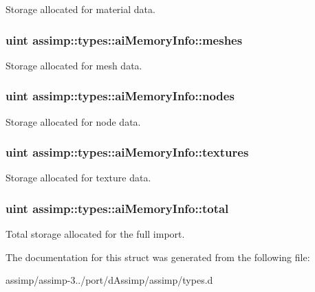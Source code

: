 Storage allocated for material data. \hypertarget{structassimp_1_1types_1_1ai_memory_info_a48f750621e7eba688fb3865838733fa6}{
\subsubsection[{meshes}]{\setlength{\rightskip}{0pt plus 5cm}uint assimp\+::types\+::ai\+Memory\+Info\+::meshes}}\label{structassimp_1_1types_1_1ai_memory_info_a48f750621e7eba688fb3865838733fa6}
Storage allocated for mesh data. \hypertarget{structassimp_1_1types_1_1ai_memory_info_a86112d8082eb8acafdbb45b768d56a0b}{
\subsubsection[{nodes}]{\setlength{\rightskip}{0pt plus 5cm}uint assimp\+::types\+::ai\+Memory\+Info\+::nodes}}\label{structassimp_1_1types_1_1ai_memory_info_a86112d8082eb8acafdbb45b768d56a0b}
Storage allocated for node data. \hypertarget{structassimp_1_1types_1_1ai_memory_info_a63f5b49b428fca3a5f92f58d0814f0bc}{
\subsubsection[{textures}]{\setlength{\rightskip}{0pt plus 5cm}uint assimp\+::types\+::ai\+Memory\+Info\+::textures}}\label{structassimp_1_1types_1_1ai_memory_info_a63f5b49b428fca3a5f92f58d0814f0bc}
Storage allocated for texture data. \hypertarget{structassimp_1_1types_1_1ai_memory_info_a5e65cad95960a53a4f960e87f0afd546}{
\subsubsection[{total}]{\setlength{\rightskip}{0pt plus 5cm}uint assimp\+::types\+::ai\+Memory\+Info\+::total}}\label{structassimp_1_1types_1_1ai_memory_info_a5e65cad95960a53a4f960e87f0afd546}
Total storage allocated for the full import. 

The documentation for this struct was generated from the following file\+:\begin{DoxyCompactItemize}
\item 
assimp/assimp-\/3../port/d\+Assimp/assimp/types.\+d\end{DoxyCompactItemize}
